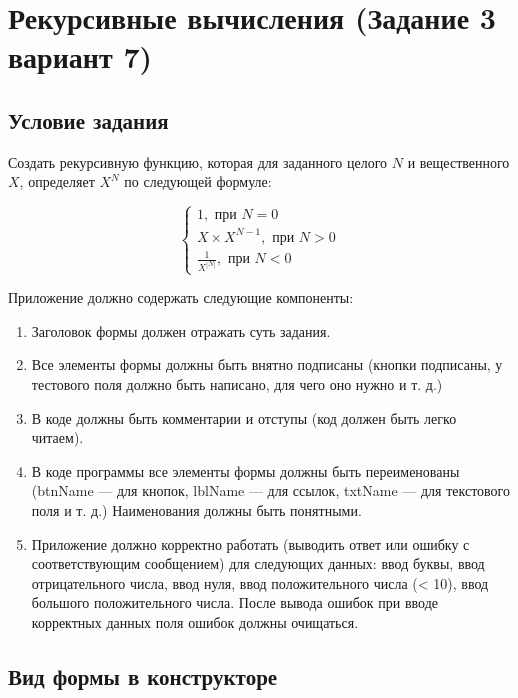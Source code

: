 \section{Рекурсивные вычисления (Задание 3 вариант 7)}

\subsection{Условие задания}

Создать рекурсивную функцию, которая для заданного целого $N$ и вещественного $X$, определяет $X^N$ по следующей формуле:

\begin{equation*}
    \begin{cases}
        1, \text{ при } N = 0 \\ 
        X \times X^{N - 1}, \text{ при } N > 0 \\ 
        \frac{1}{X^{|N|}}, \text{ при } N < 0
    \end{cases}
\end{equation*}


Приложение должно содержать следующие компоненты:

\begin{enumerate}
    \item{Заголовок формы должен отражать суть задания.}
    \item{Все элементы формы должны быть внятно подписаны (кнопки подписаны, у тестового поля должно быть написано, для чего оно нужно и т. д.)}
    \item{В коде должны быть комментарии и отступы (код должен быть легко читаем).}
    \item{В коде программы все элементы формы должны быть переименованы (btnName ---  для кнопок, lblName --- для ссылок, txtName --- для текстового поля и т. д.) Наименования должны быть понятными.}
    \item{Приложение должно корректно работать (выводить ответ или ошибку с соответствующим сообщением) для следующих данных: ввод буквы, ввод отрицательного числа, ввод нуля, ввод положительного числа (< 10), ввод большого положительного числа. После вывода ошибок при вводе корректных данных поля ошибок должны очищаться.}
\end{enumerate}

\subsection{Вид формы в конструкторе}

